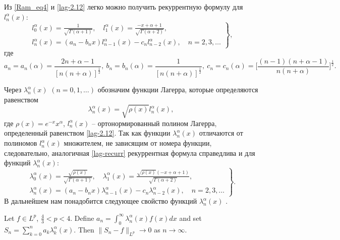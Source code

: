 Из \eqref{Ram_eq4} и \eqref{lag-2.12} легко можно получить рекуррентную формулу для $l_n^\alpha(x)$:
\begin{equation}\label{lag-recurr}
\left.\begin{gathered}
l_{0}^{\alpha}(x)=\frac{1}{\sqrt{\Gamma(\alpha+1)}}, \quad l_1^{\alpha}(x)=\frac{-x+\alpha+1}{\sqrt{\Gamma(\alpha+2)}},\\
l_n^{\alpha}(x)=(a_n-b_n x)l_{n-1}^{\alpha}(x)-c_n l_{n-2}^{\alpha}(x), \quad n=2, 3, \ldots
\end{gathered}\right\},
\end{equation}
где
\begin{equation*}
a_n=a_n(\alpha)=\frac{2n+\alpha-1}{[n(n+\alpha)]^\frac{1}{2}},\
b_n=b_n(\alpha)=\frac{1}{[n(n+\alpha)]^\frac{1}{2}},\
c_n=c_n(\alpha)=\Big[\frac{(n-1)(n+\alpha-1)}{n(n+\alpha)}\Big]^\frac{1}{2}.
\end{equation*}

Через $\lambda_n^\alpha(x)$ $(n=0, 1, \ldots)$ обозначим функции Лагерра, которые определяются равенством
\begin{equation}\label{funcLag}
\lambda_n^\alpha(x)=\sqrt{\rho(x)}l_n^\alpha(x),
\end{equation}
где $\rho(x)=e^{-x}x^\alpha$, $l_n^\alpha(x)$ -- ортонормированный полином Лагерра, определенный равенством \eqref{lag-2.12}.
Так как функции $\lambda_n^\alpha(x)$ отличаются от полиномов $l_n^\alpha(x)$ множителем, не зависящим от номера функции, следовательно, аналогичная \eqref{lag-recurr} рекуррентная формула справедлива и для функций $\lambda_n^\alpha(x)$:
\begin{equation*}
\left.\begin{gathered}
\lambda_{0}^{\alpha}(x)=\frac{\sqrt{\rho(x)}}{\sqrt{\Gamma(\alpha+1)}}, \quad \lambda_1^{\alpha}(x)=\frac{\sqrt{\rho(x)}(-x+\alpha+1)}{\sqrt{\Gamma(\alpha+2)}},\\
\lambda_n^{\alpha}(x)=(a_n-b_n x)\lambda_{n-1}^{\alpha}(x)-c_n \lambda_{n-2}^{\alpha}(x), \quad n=2, 3, \ldots
\end{gathered}\right\}.
\end{equation*}
В дальнейшем нам понадобится следующее свойство функций $\lambda_{n}^{\alpha}(x)$ \cite[Theorem 1]{Ramlib1}.

\begin{theoremA}\label{Ram_thA}
	Let $f\in L^p$, $\frac{4}{3}<p<4$. Define $a_n=\int_{0}^{\infty}\lambda^\alpha_n(x)f(x)dx$ and set $S_n=\sum_{k=0}^{n}a_k\lambda^\alpha_k(x)$. Then $\|S_n-f\|_{L^p}\rightarrow0$ as $n\rightarrow\infty$.
\end{theoremA}


